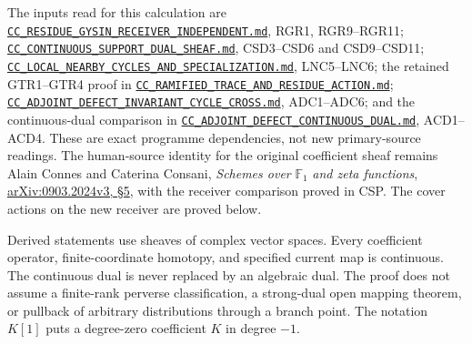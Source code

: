 The inputs read for this calculation are
\href{https://github.com/KokunoYumeto/zeta-function-research-reader/blob/main/workbenches/splitzero-tandem/continuations/20260925-source-endpoint-and-section/sources/programme/cc_sheaf/CC_RESIDUE_GYSIN_RECEIVER_INDEPENDENT.md}{\nolinkurl{CC_RESIDUE_GYSIN_RECEIVER_INDEPENDENT.md}},
RGR1, RGR9--RGR11;
\href{https://github.com/KokunoYumeto/zeta-function-research-reader/blob/96b02efaf4511d07f33de5ea4cfb10058e905d7e/workbenches/splitzero-tandem/continuations/20260924-cohomology-weight-and-character-lifts/gct-weight-control/proofs/CC_CONTINUOUS_SUPPORT_DUAL_SHEAF.md}{\nolinkurl{CC_CONTINUOUS_SUPPORT_DUAL_SHEAF.md}},
CSD3--CSD6 and CSD9--CSD11;
\href{https://github.com/KokunoYumeto/zeta-function-research-reader/blob/96b02efaf4511d07f33de5ea4cfb10058e905d7e/workbenches/splitzero-tandem/continuations/20260924-cohomology-weight-and-character-lifts/gct-weight-control/proofs/CC_LOCAL_NEARBY_CYCLES_AND_SPECIALIZATION.md}{\nolinkurl{CC_LOCAL_NEARBY_CYCLES_AND_SPECIALIZATION.md}},
LNC5--LNC6; the retained GTR1--GTR4 proof in
\href{https://github.com/KokunoYumeto/zeta-function-research-reader/blob/main/workbenches/splitzero-tandem/continuations/20260925-source-endpoint-and-section/CC_RAMIFIED_TRACE_AND_RESIDUE_ACTION.md}{\nolinkurl{CC_RAMIFIED_TRACE_AND_RESIDUE_ACTION.md}};
\href{https://github.com/KokunoYumeto/zeta-function-research-reader/blob/main/workbenches/splitzero-tandem/continuations/20260925-source-endpoint-and-section/CC_ADJOINT_DEFECT_INVARIANT_CYCLE_CROSS.md}{\nolinkurl{CC_ADJOINT_DEFECT_INVARIANT_CYCLE_CROSS.md}},
ADC1--ADC6; and the continuous-dual comparison in
\href{https://github.com/KokunoYumeto/zeta-function-research-reader/blob/main/workbenches/splitzero-tandem/continuations/20260925-source-endpoint-and-section/CC_ADJOINT_DEFECT_CONTINUOUS_DUAL.md}{\nolinkurl{CC_ADJOINT_DEFECT_CONTINUOUS_DUAL.md}},
ACD1--ACD4. These are exact programme dependencies, not new
primary-source readings. The human-source identity for the original
coefficient sheaf remains Alain Connes and Caterina Consani,
\emph{Schemes over} \(\mathbb F_1\) \emph{and zeta functions},
\href{https://arxiv.org/abs/0903.2024v3}{arXiv:0903.2024v3, §5}, with
the receiver comparison proved in CSP. The cover actions on the new
receiver are proved below.

Derived statements use sheaves of complex vector spaces. Every
coefficient operator, finite-coordinate homotopy, and specified current
map is continuous. The continuous dual is never replaced by an algebraic
dual. The proof does not assume a finite-rank perverse classification, a
strong-dual open mapping theorem, or pullback of arbitrary distributions
through a branch point. The notation \(K[1]\) puts a degree-zero
coefficient \(K\) in degree \(-1\).

